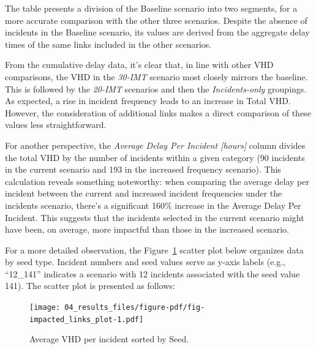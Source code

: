 \documentclass[fancy, oneside, mastersfancy, ms]{byuthesis}
\begin{document}
The table presents a division of the Baseline scenario into two
segments, for a more accurate comparison with the other three scenarios.
Despite the absence of incidents in the Baseline scenario, its values
are derived from the aggregate delay times of the same links included in
the other scenarios.

From the cumulative delay data, it's clear that, in line with other VHD
comparisons, the VHD in the \emph{30-IMT} scenario most closely mirrors
the baseline. This is followed by the \emph{20-IMT} scenarios and then
the \emph{Incidents-only} groupings. As expected, a rise in incident
frequency leads to an increase in Total VHD. However, the consideration
of additional links makes a direct comparison of these values less
straightforward.

For another perspective, the \emph{Average Delay Per Incident
{[}hours{]}} column divides the total VHD by the number of incidents
within a given category (90 incidents in the current scenario and 193 in
the increased frequency scenario). This calculation reveals something
noteworthy: when comparing the average delay per incident between the
current and increased incident frequencies under the incidents scenario,
there's a significant 160\% increase in the Average Delay Per Incident.
This suggests that the incidents selected in the current scenario might
have been, on average, more impactful than those in the increased
scenario.

For a more detailed observation, the
Figure~\ref{fig-impacted_links_plot} scatter plot below organizes data
by seed type. Incident numbers and seed values serve as y-axis labels
(e.g., ``12\_141'' indicates a scenario with 12 incidents associated
with the seed value 141). The scatter plot is presented as follows:

\begin{figure}

{\centering \texttt{[image: 04\_results\_files/figure-pdf/fig-impacted\_links\_plot-1.pdf]}

}

\caption{\label{fig-impacted_links_plot}Average VHD per incident sorted
by Seed.}

\end{figure}
\end{document}
